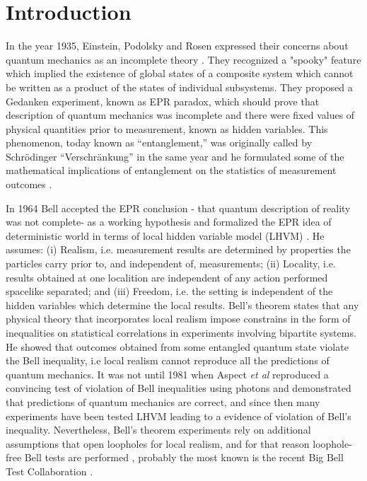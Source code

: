 \documentclass[10pt,a4paper]{book}
\numberwithin{equation}{chapter}
\numberwithin{figure}{chapter}
\numberwithin{table}{chapter}
\begin{document}
\chapter{Introduction}

In the year 1935, Einstein, Podolsky and Rosen expressed their concerns about quantum mechanics as an incomplete theory \cite{EPR}. They recognized a "spooky" feature which implied the existence of global states of a composite system which cannot be written as a product of the states of individual subsystems.
They proposed a Gedanken experiment, known as EPR paradox, which should prove that description of quantum mechanics was incomplete and there were fixed values of physical quantities prior to measurement, known as hidden variables. This phenomenon, today known as “entanglement,” was originally called by Schrödinger “Verschränkung” in the same year and he formulated some of the mathematical implications of entanglement on the statistics of measurement outcomes \cite{schrodinger}. 

In 1964 Bell accepted the EPR conclusion - that quantum description of reality was not complete- as a working hypothesis and formalized the EPR idea of deterministic world in terms of local hidden variable model (LHVM) \cite{bell}. He assumes: (i) Realism, i.e. measurement results are determined by properties the particles carry prior to, and independent of, measurements; (ii) Locality, i.e. results obtained at one localition are independent of any action performed spacelike separated; and (iii) Freedom, i.e. the setting is independent of the hidden variables which determine the local results. Bell's theorem states that any physical theory that incorporates local realism impose constrains in the form of inequalities on statistical correlations in experiments involving bipartite systems. He showed that outcomes obtained from some entangled quantum state violate the Bell inequality, i.e local realism cannot reproduce all the predictions of quantum mechanics. It was not until 1981 when Aspect \textit{et al} reproduced a convincing test of violation of Bell inequalities \cite{aspect} using photons and demonstrated that predictions of quantum mechanics are correct, and since then many experiments have been tested LHVM leading to a evidence of violation of Bell's inequality. Nevertheless, Bell's theorem experiments rely on additional assumptions that open loopholes for local realism, and for that reason loophole-free Bell tests are performed \cite{belltest}, probably the most known is the recent Big Bell Test Collaboration \cite{bigbelltest}.
\end{document}
